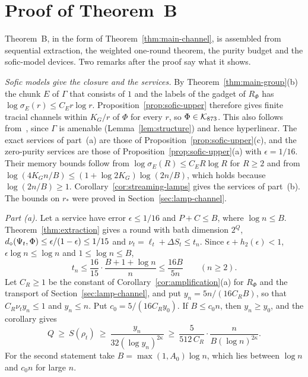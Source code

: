 \section{Proof of Theorem~B}\label{sec:main-channel-proof}

Theorem~B, in the form of Theorem~\ref{thm:main-channel}, is assembled from sequential extraction, the weighted one-round theorem, the purity
budget and the sofic-model devices. Two remarks after the proof say what it shows.

\emph{Sofic models give the closure and the services.} By Theorem~\ref{thm:main-group}(b) the chunk $E$ of $\Gamma$ that consists of $1$ and
the labels of the gadget of $R_\Phi$ has $\log\sigma_E(r)\le C_Er\log r$. Proposition~\ref{prop:sofic-upper} therefore gives finite tracial
channels within $K_G/r$ of $\Phi$ for every $r$, so $\Phi\in\mathcal K_{873}$. This also follows from~\cite{DouglasMghirbiB}, since $\Gamma$ is amenable
(Lemma~\ref{lem:structure}) and hence hyperlinear. The exact services of part~(a) are those of Proposition~\ref{prop:sofic-upper}(c), and the
zero-purity services are those of Proposition~\ref{prop:sofic-upper}(a) with $\epsilon=1/16$. Their memory bounds follow from
$\log\sigma_E(R)\le C_ER\log R$ for $R\ge2$ and from $\log(4K_Gn/B)\le(1+\log2K_G)\log(2n/B)$, which holds because $\log(2n/B)\ge1$.
Corollary~\ref{cor:streaming-lamps} gives the services of part~(b). The bounds on $r_*$ were proved in Section~\ref{sec:lamp-channel}.

\emph{Part (a).} Let a service have error $\epsilon\le1/16$ and $P+C\le B$, where $\log n\le B$. Theorem~\ref{thm:extraction} gives a round with
bath dimension $2^Q$, $d_\diamond(\Psi_t,\Phi)\le\epsilon/(1-\epsilon)\le1/15$ and $\nu_t=\ell_t+\Delta S_t\le t_n$. Since $\epsilon+h_2(\epsilon)<1$,
$\epsilon\log n\le\log n$ and $1\le\log n\le B$,
\[
t_n\le\frac{16}{15}\cdot\frac{B+1+\log n}{n}\le\frac{16B}{5n}\qquad(n\ge2).
\]
Let $C_R\ge1$ be the constant of Corollary~\ref{cor:amplification}(a) for $R_\Phi$ and the transport of Section~\ref{sec:lamp-channel}, and put
$y_n=5n/(16C_RB)$, so that $C_R\nu_ty_n\le1$ and $y_n\le n$. Put $c_0=5/(16C_Ry_0)$. If $B\le c_0n$, then $y_n\ge y_0$, and the corollary gives
\[
Q\ \ge\ S(\rho_t)\ \ge\ \frac{y_n}{32(\log y_n)^{2\kappa}}\ \ge\ \frac{5}{512\,C_R}\cdot\frac{n}{B(\log n)^{2\kappa}} .
\]
For the second statement take $B=\max(1,A_0)\log n$, which lies between $\log n$ and $c_0n$ for large $n$.

